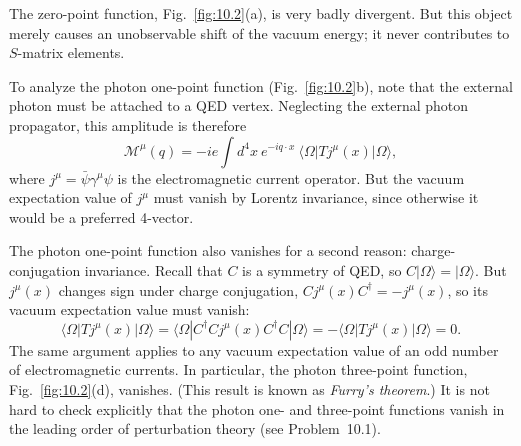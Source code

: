 The zero-point function, Fig.~\ref{fig:10.2}(a), is very badly divergent.  But
this object merely causes an unobservable shift of the vacuum energy; it never
contributes to $S$-matrix elements.

To analyze the photon one-point function (Fig.~\ref{fig:10.2}b), note that the
external photon must be attached to a QED vertex.  Neglecting the external
photon propagator, this amplitude is therefore
\begin{equation}
  \mathcal{M}^\mu(q) = -ie\int d^4x\ e^{-iq\cdot x}\
    \langle\Omega|T j^\mu(x)|\Omega\rangle ,
  \label{eq:10.5}
\end{equation}
where $j^\mu = \bar{\psi}\gamma^\mu\psi$ is the electromagnetic current
operator.  But the vacuum expectation value of $j^\mu$ must vanish by Lorentz
invariance, since otherwise it would be a preferred 4-vector.

The photon one-point function also vanishes for a second reason:
charge-conjugation invariance.  Recall that $C$ is a symmetry of QED, so
$C|\Omega\rangle = |\Omega\rangle$.  But $j^\mu(x)$ changes sign under charge
conjugation, $Cj^\mu(x)C^{\dagger} = -j^\mu(x)$, so its vacuum expectation
value must vanish:
\begin{equation}
  \langle\Omega|T j^\mu(x)|\Omega\rangle
  = \langle\Omega|C^{\dagger}Cj^\mu(x)C^{\dagger}C|\Omega\rangle
  = -\langle\Omega|T j^\mu(x)|\Omega\rangle = 0 .
\end{equation}
The same argument applies to any vacuum expectation value of an odd number of
electromagnetic currents.  In particular, the photon three-point function,
Fig.~\ref{fig:10.2}(d), vanishes.  (This result is known as \emph{Furry's
theorem}.)  It is not hard to check explicitly that the photon one- and
three-point functions vanish in the leading order of perturbation theory (see
Problem~10.1).

